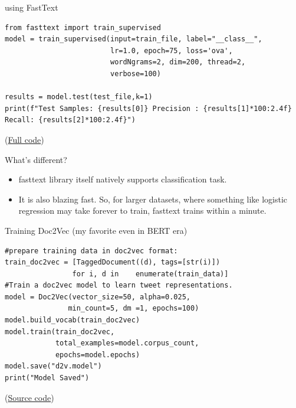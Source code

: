\documentclass{beamer}
\begin{document}
\begin{frame}[fragile]{using FastText}
\tiny
    \begin{verbatim}
from fasttext import train_supervised 
model = train_supervised(input=train_file, label="__class__", 
                         lr=1.0, epoch=75, loss='ova', 
                         wordNgrams=2, dim=200, thread=2, 
                         verbose=100)
                         
results = model.test(test_file,k=1)
print(f"Test Samples: {results[0]} Precision : {results[1]*100:2.4f} Recall: {results[2]*100:2.4f}")
    \end{verbatim}
    (\href{https://github.com/practical-nlp/practical-nlp/blob/master/Ch4/04_FastText_Example.ipynb}{Full code})
\end{frame}

\begin{frame}{What's different?}
    \begin{itemize}
        \item fasttext library itself natively supports classification task.
        \item It is also blazing fast. So, for larger datasets, where something like logistic regression may take forever to train, fasttext trains within a minute. 
    \end{itemize}
\end{frame}

\begin{frame}[fragile]{Training Doc2Vec (my favorite even in BERT era)}
\tiny
    \begin{verbatim}
#prepare training data in doc2vec format:
train_doc2vec = [TaggedDocument((d), tags=[str(i)]) 
                for i, d in    enumerate(train_data)]
#Train a doc2vec model to learn tweet representations. 
model = Doc2Vec(vector_size=50, alpha=0.025, 
               min_count=5, dm =1, epochs=100)
model.build_vocab(train_doc2vec)
model.train(train_doc2vec, 
            total_examples=model.corpus_count, 
            epochs=model.epochs)
model.save("d2v.model")
print("Model Saved")
    \end{verbatim}
        (\href{https://github.com/practical-nlp/practical-nlp/blob/master/Ch4/02_Doc2Vec_Example.ipynb}{Source code})
\end{frame}
\end{document}
